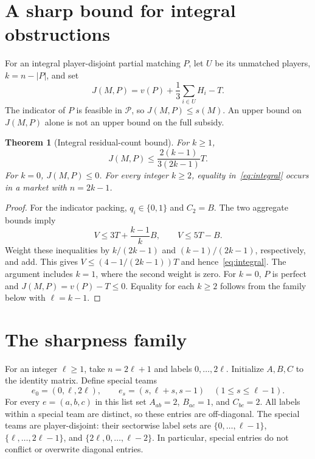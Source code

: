 \documentclass[11pt]{article}
\newtheorem{theorem}{Theorem}[section]
\theoremstyle{remark}
\newcommand{\pack}{\mathcal P}
\begin{document}
\section{A sharp bound for integral obstructions}\label{sec:integral}
For an integral player-disjoint partial matching $P$, let $U$ be its
unmatched players, $k=n-|P|$, and set
\[
              J(M,P)=v(P)+\frac13\sum_{i\in U}H_i-T.
\]
The indicator of $P$ is feasible in $\pack$, so $J(M,P)\le s(M)$.
An upper bound on $J(M,P)$ alone is not an upper bound on the full subsidy.

\begin{theorem}[Integral residual-count bound]\label{thm:integral}
For $k\ge1$,
\begin{equation}\label{eq:integral}
             J(M,P)\le\frac{2(k-1)}{3(2k-1)}T.
\end{equation}
For $k=0$, $J(M,P)\le0$. For every integer $k\ge2$, equality
in~\eqref{eq:integral} occurs in a market with $n=2k-1$.
\end{theorem}
\begin{proof}
For the indicator packing, $q_i\in\{0,1\}$ and $C_2=B$. The two
aggregate bounds imply
\[
               V\le3T+\frac{k-1}{k}B,\qquad V\le5T-B.
\]
Weight these inequalities by $k/(2k-1)$ and $(k-1)/(2k-1)$,
respectively, and add. This gives
$V\le(4-1/(2k-1))T$ and hence~\eqref{eq:integral}.
The argument includes $k=1$, where the second weight is zero.
For $k=0$, $P$ is perfect and $J(M,P)=v(P)-T\le0$.
Equality for each $k\ge2$ follows from the family below with
$\ell=k-1$.
\end{proof}

\section{The sharpness family}\label{sec:family}
For an integer $\ell\ge1$, take $n=2\ell+1$ and labels
$0,\ldots,2\ell$. Initialize $A,B,C$ to the identity matrix. Define
special teams
\begin{equation}\label{eq:family}
 e_0=(0,\ell,2\ell),\qquad
 e_s=(s,\ell+s,s-1)\quad(1\le s\le\ell-1).
\end{equation}
For every $e=(a,b,c)$ in this list set
$A_{ab}=2$, $B_{ac}=1$, and $C_{bc}=2$.
All labels within a special team are distinct, so these entries are
off-diagonal. The special teams are player-disjoint: their sectorwise
label sets are $\{0,\ldots,\ell-1\}$,
$\{\ell,\ldots,2\ell-1\}$, and
$\{2\ell,0,\ldots,\ell-2\}$. In particular, special entries do not
conflict or overwrite diagonal entries.
\end{document}
